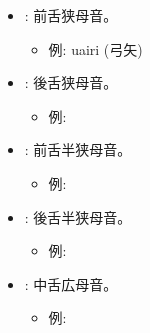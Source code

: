 \begin{itemize}
    \item \textbf{}: 前舌狭母音。
    \begin{itemize}
        \item 例: uairi \textipa{[waiRi]} (弓矢)
    \end{itemize}

    \item \textbf{}: 後舌狭母音。
    \begin{itemize}
        \item 例: %
    \end{itemize}

    \item \textbf{}: 前舌半狭母音。
    \begin{itemize}
        \item 例: %
    \end{itemize}

    \item \textbf{}: 後舌半狭母音。
    \begin{itemize}
        \item 
例: %
    \end{itemize}

    \item \textbf{}: 中舌広母音。
    \begin{itemize}
        \item 例: %
    \end{itemize}
\end{itemize}